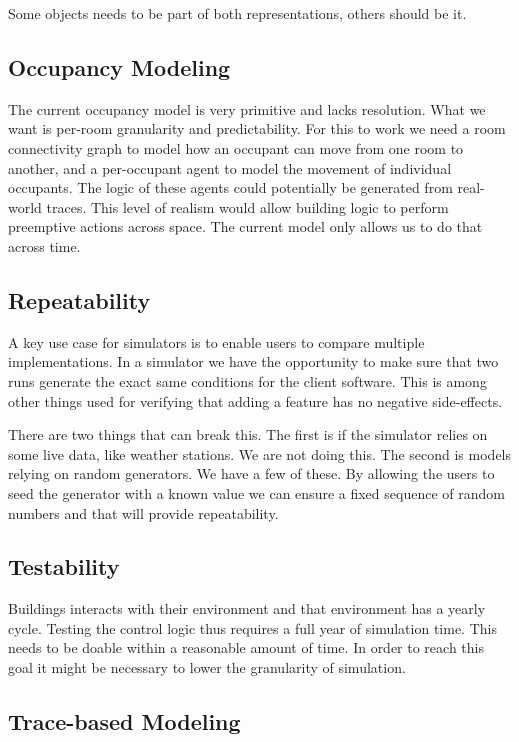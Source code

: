 \documentclass[10pt]{article}
\begin{document}
Some objects needs to be part of both representations, others should be it.

\subsection{Occupancy Modeling}
\label{lessons:occupancy}

The current occupancy model is very primitive and lacks resolution. What we want is per-room granularity and predictability. For this to work we need a room connectivity graph to model how an occupant can move from one room to another, and a per-occupant agent to model the movement of individual occupants. The logic of these agents could potentially be generated from real-world traces. This level of realism would allow building logic to perform preemptive actions across space. The current model only allows us to do that across time.

\subsection{Repeatability}

A key use case for simulators is to enable users to compare multiple implementations. In a simulator we have the opportunity to make sure that two runs generate the exact same conditions for the client software. This is among other things used for verifying that adding a feature has no negative side-effects.

There are two things that can break this. The first is if the simulator relies on some live data, like weather stations. We are not doing this. The second is models relying on random generators. We have a few of these. By allowing the users to seed the generator with a known value we can ensure a fixed sequence of random numbers and that will provide repeatability.

\subsection{Testability}

Buildings interacts with their environment and that environment has a yearly cycle. Testing the control logic thus requires a full year of simulation time. This needs to be doable within a reasonable amount of time. In order to reach this goal it might be necessary to lower the granularity of simulation.

\subsection{Trace-based Modeling}
\end{document}
